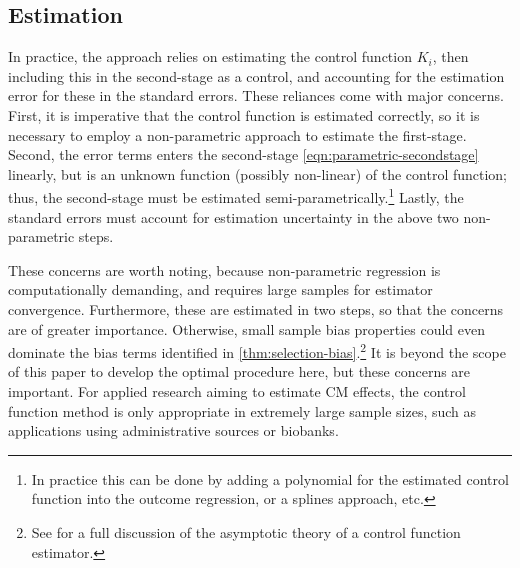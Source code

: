 \subsection{Estimation}
In practice, the approach relies on estimating the control function $K_i$, then including this in the second-stage as a control, and accounting for the estimation error for these in the standard errors.
These reliances come with major concerns.
First, it is imperative that the control function is estimated correctly, so it is necessary to employ a non-parametric approach to estimate the first-stage.
Second, the error terms enters the second-stage \eqref{eqn:parametric-secondstage} linearly, but is an unknown function (possibly non-linear) of the control function; thus, the second-stage must be estimated semi-parametrically.\footnote{
    In practice this can be done by adding a polynomial for the estimated control function into the outcome regression, or a splines approach, etc. 
}
Lastly, the standard errors must account for estimation uncertainty in the above two non-parametric steps.

These concerns are worth noting, because non-parametric regression is computationally demanding, and requires large samples for estimator convergence. 
Furthermore, these are estimated in two steps, so that the concerns are of greater importance.
Otherwise, small sample bias properties could even dominate the bias terms identified in \autoref{thm:selection-bias}.\footnote{
    See \cite[Section~6]{imbens2009identification} for a full discussion of the asymptotic theory of a control function estimator.
}
It is beyond the scope of this paper to develop the optimal procedure here, but these concerns are important.
For applied research aiming to estimate CM effects, the control function method is only appropriate in extremely large sample sizes, such as applications using administrative sources or biobanks.

